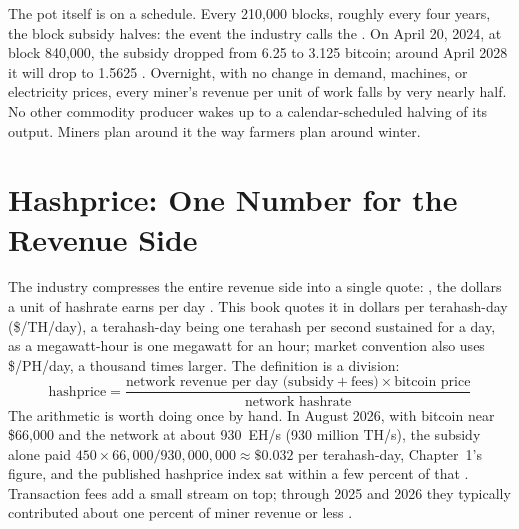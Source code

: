 The pot itself is on a schedule. Every 210,000 blocks, roughly every four years, the block subsidy halves: the event the industry calls the . On April 20, 2024, at block 840,000, the subsidy dropped from 6.25 to 3.125 bitcoin; around April 2028 it will drop to 1.5625 \autocite{mempool840000,pan2024halving,braiins2024miningbasics}. %
Overnight, with no change in demand, machines, or electricity prices, every miner's revenue per unit of work falls by very nearly half. No other commodity producer wakes up to a calendar-scheduled halving of its output. Miners plan around it the way farmers plan around winter.

\section{Hashprice: One Number for the Revenue Side}

The industry compresses the entire revenue side into a single quote: , the dollars a unit of hashrate earns per day \autocite{braiinsacademyhashprice}. %
This book quotes it in dollars per terahash-day (\$/TH/day), a terahash-day being one terahash per second sustained for a day, as a megawatt-hour is one megawatt for an hour; market convention also uses \$/PH/day, a thousand times larger. The definition is a division:
\[
\text{hashprice} = \frac{\text{network revenue per day (subsidy} + \text{fees)} \times \text{bitcoin price}}{\text{network hashrate}}
\]
The arithmetic is worth doing once by hand. In August 2026, with bitcoin near \$66{,}000 and the network at about 930~EH/s (930 million TH/s), the subsidy alone paid $450 \times 66{,}000 / 930{,}000{,}000 \approx \$0.032$ per terahash-day, Chapter~1's figure, and the published hashprice index sat within a few percent of that \autocite{BraiinsInsightsHashprice}. %
Transaction fees add a small stream on top; through 2025 and 2026 they typically contributed about one percent of miner revenue or less \autocite{coinmetrics2025sotn304,CoinSharesMiningQ12026}. %

